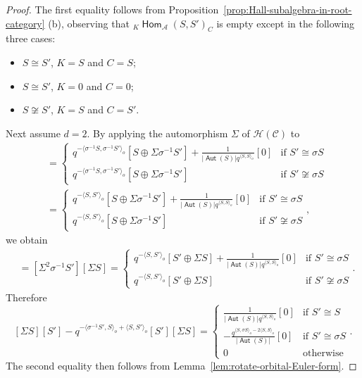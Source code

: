 \documentclass[reqno,12pt,a4paper]{amsart}
\theoremstyle{remark}
\theoremstyle{definition}
\newcommand{\opname}[1]{\operatorname{\mathsf{#1}}}
\newcommand{\Hom}{\opname{Hom}}
\newcommand{\Aut}{\opname{Aut}}
\newcommand{\ca}{{\mathcal A}}
\newcommand{\cc}{{\mathcal C}}
\newcommand{\ch}{{\mathcal H}}
\numberwithin{equation}{section}
\begin{document}
\begin{proof}
The first equality follows from Proposition~\ref{prop:Hall-subalgebra-in-root-category} (b), observing that ${}_K\Hom_\ca(S,S')_C$ is empty except in the following three cases:
\begin{itemize}
\item[-] $S\cong S'$, $K=S$ and $C=S$;
\item[-] $S\cong S'$, $K=0$ and $C=0$;
\item[-] $S\not\cong S'$, $K=S$ and $C=S'$.
\end{itemize}

Next assume $d=2$. By applying the automorphism $\Sigma$ of $\ch(\cc)$ to
\begin{align*}
[\Sigma \sigma^{-1}S'][S]&=\begin{cases} q^{-\langle\sigma^{-1}S,\sigma^{-1} S'\rangle_o}[S\oplus\Sigma \sigma^{-1} S']+\frac{1}{|\Aut(S)|q^{\langle S,S\rangle_o}}[0] & \text{if }S'\cong \sigma S\\
q^{-\langle\sigma^{-1}S,\sigma^{-1}S'\rangle_o}[S\oplus\Sigma \sigma^{-1}S'] & \text{if }S'\not\cong \sigma S
\end{cases}\\
&=\begin{cases} q^{-\langle S,S'\rangle_o}[S\oplus\Sigma \sigma^{-1}S']+\frac{1}{|\Aut(S)|q^{\langle S,S\rangle_o}}[0] & \text{if }S'\cong \sigma S\\
q^{-\langle S,S'\rangle_o}[S\oplus\Sigma \sigma^{-1}S'] & \text{if }S'\not\cong \sigma S
\end{cases},
\end{align*}
we obtain
\begin{align*}
[S'][\Sigma S]&=[\Sigma^2 \sigma^{-1}S'][\Sigma S]=
\begin{cases} q^{-\langle S,S'\rangle_o}[S'\oplus\Sigma S]+\frac{1}{|\Aut(S)|q^{\langle S,S\rangle_o}}[0] & \text{if }S'\cong \sigma S\\
q^{-\langle S,S'\rangle_o}[S'\oplus\Sigma S] & \text{if }S'\not\cong \sigma S
\end{cases}.
\end{align*}
Therefore
\[
[\Sigma S][S']-q^{-\langle \sigma^{-1}S',S\rangle_o+\langle S,S'\rangle_o}[S'][\Sigma S]=
\begin{cases} \frac{1}{|\Aut(S)|q^{\langle S,S\rangle_o}}[0] & \text{if }S'\cong S\\[5pt]
-\frac{q^{\langle S,\sigma S\rangle_o-2\langle S,S\rangle_o}}{|\Aut(S)|}[0]& \text{if }S'\cong\sigma S\\
0 &\text{otherwise}
\end{cases}.
\]
The second equality then follows from Lemma~\ref{lem:rotate-orbital-Euler-form}.


\end{proof}
\end{document}
